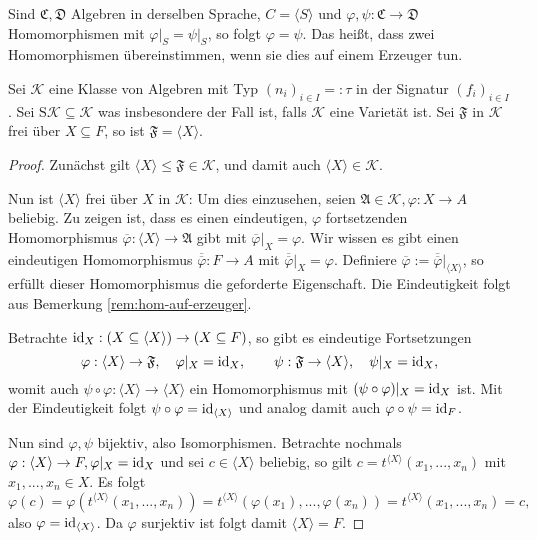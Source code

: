 
\begin{remark} \label{rem:hom-auf-erzeuger}
    Sind $\mathfrak{C}, \mathfrak{D}$ Algebren in derselben Sprache, $C = \langle S \rangle$ und $\varphi, \psi : \mathfrak{C} \to \mathfrak{D}$ Homomorphismen mit $\varphi \vert_S = \psi \vert_S$, so folgt $\varphi = \psi$. Das heißt, dass zwei Homomorphismen übereinstimmen, wenn sie dies auf einem Erzeuger tun.
\end{remark}

\begin{proposition}
    Sei $\mathcal{K}$ eine Klasse von Algebren mit Typ $(n_i)_{i \in I} =: \tau$ in der Signatur $(f_i)_{i\in I}$. Sei $\mathrm{S}\mathcal{K}\subseteq\mathcal{K} $ was insbesondere der Fall ist, falls $\mathcal{K}$ eine Varietät ist. Sei $\mathfrak{F}$ in $\mathcal{K}$ frei über $X \subseteq F$, so ist $\mathfrak{F} = \langle X \rangle$.
\end{proposition}

\begin{proof}
    Zunächst gilt $ \langle X \rangle \leq \mathfrak{F} \in \mathcal{K} $, und damit auch $ \langle X \rangle \in \mathcal{K} $.

    Nun ist $ \langle X \rangle $ frei über $X$ in $\mathcal{K}$: Um dies einzusehen, seien $\mathfrak{A} \in \mathcal{K}, \varphi : X \to A$ beliebig. Zu zeigen ist, dass es einen eindeutigen, $\varphi$ fortsetzenden Homomorphismus $\overline{\varphi} : \langle X \rangle \to \mathfrak{A}$ gibt mit $\overline{\varphi} \vert_X = \varphi$. Wir wissen es gibt einen eindeutigen Homomorphismus $\overline{\overline{\varphi}} : F \to A$ mit $\overline{\overline{\varphi}} \vert_X = \varphi$. Definiere $\overline{\varphi} := \overline{\overline{\varphi}} \vert_{\langle X \rangle}$, so erfüllt dieser Homomorphismus die geforderte Eigenschaft. Die Eindeutigkeit folgt aus Bemerkung \ref{rem:hom-auf-erzeuger}.

    Betrachte $\operatorname{id}_X : (X \subseteq \langle X \rangle) \to (X \subseteq F)$, so gibt es eindeutige Fortsetzungen
    $$ \varphi : \langle X \rangle \to \mathfrak{F}, \quad \varphi \vert_X = \operatorname{id}_X, \quad\quad \psi : \mathfrak{F} \to \langle X \rangle, \quad \psi \vert_X = \operatorname{id}_X, $$
    womit auch $\psi \circ \varphi : \langle X \rangle \to \langle X \rangle$ ein Homomorphismus mit $(\psi \circ \varphi) \vert_X = \operatorname{id}_X$ ist. Mit der Eindeutigkeit folgt $\psi \circ \varphi = \operatorname{id}_{\langle X \rangle}$ und analog damit auch $\varphi \circ \psi = \operatorname{id}_F$.

    Nun sind $\varphi, \psi$ bijektiv, also Isomorphismen. Betrachte nochmals $\varphi : \langle X \rangle \to F, \varphi \vert_X = \operatorname{id}_X$ und sei $c \in \langle X \rangle$ beliebig, so gilt $c = t^{\langle X \rangle}(x_1, ..., x_n)$ mit $x_1, ..., x_n \in X$. Es folgt
    $$ \varphi(c) = \varphi(t^{\langle X \rangle}(x_1, ..., x_n)) = t^{\langle X \rangle}(\varphi(x_1), ..., \varphi(x_n)) = t^{\langle X \rangle}(x_1, ..., x_n) = c, $$
    also $\varphi = \operatorname{id}_{\langle X \rangle}$. Da $\varphi$ surjektiv ist folgt damit $\langle X \rangle = F$.
\end{proof}

